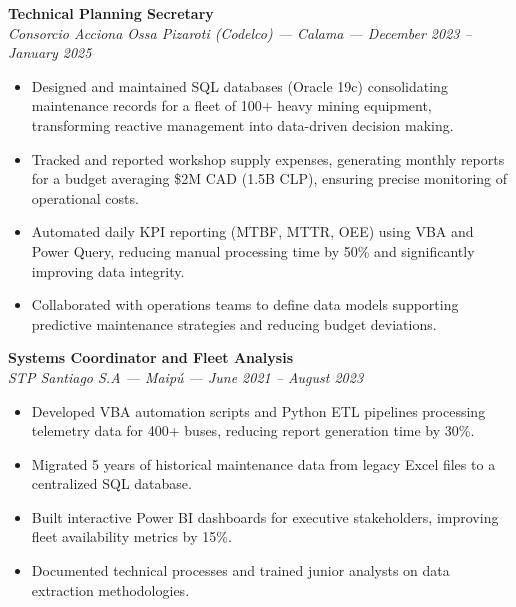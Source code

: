 \documentclass[10pt,letterpaper]{article}
\begin{document}
\vspace{0.2cm}

\noindent \textbf{Technical Planning Secretary} \\
\textit{Consorcio Acciona Ossa Pizaroti (Codelco) — Calama — December 2023 – January 2025}
\begin{itemize}
    \item Designed and maintained SQL databases (Oracle 19c) consolidating maintenance records for a fleet of 100+ heavy mining equipment, transforming reactive management into data-driven decision making.
    \item Tracked and reported workshop supply expenses, generating monthly reports for a budget averaging \$2M CAD (1.5B CLP), ensuring precise monitoring of operational costs.
    \item Automated daily KPI reporting (MTBF, MTTR, OEE) using VBA and Power Query, reducing manual processing time by 50\% and significantly improving data integrity.
    \item Collaborated with operations teams to define data models supporting predictive maintenance strategies and reducing budget deviations.
\end{itemize}

\vspace{0.2cm}

\noindent \textbf{Systems Coordinator and Fleet Analysis} \\
\textit{STP Santiago S.A — Maipú — June 2021 – August 2023}
\begin{itemize}
    \item Developed VBA automation scripts and Python ETL pipelines processing telemetry data for 400+ buses, reducing report generation time by 30\%.
    \item Migrated 5 years of historical maintenance data from legacy Excel files to a centralized SQL database.
    \item Built interactive Power BI dashboards for executive stakeholders, improving fleet availability metrics by 15\%.
    \item Documented technical processes and trained junior analysts on data extraction methodologies.
\end{itemize}

\vspace{0.4cm}


\vspace{0.3cm}
\end{document}
